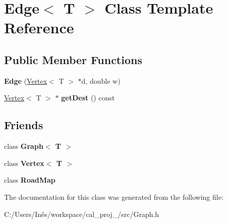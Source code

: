 \hypertarget{class_edge}{}\section{Edge$<$ T $>$ Class Template Reference}
\label{class_edge}
\subsection*{Public Member Functions}
\begin{DoxyCompactItemize}
\item 
\hypertarget{class_edge_a9da861a03f920c89984be33515a5d870}{}{\bfseries Edge} (\hyperlink{class_vertex}{Vertex}$<$ T $>$ $\ast$d, double w)\label{class_edge_a9da861a03f920c89984be33515a5d870}

\item 
\hypertarget{class_edge_aaf3e4cfb5351c3887c3f48b1c39e17f8}{}\hyperlink{class_vertex}{Vertex}$<$ T $>$ $\ast$ {\bfseries get\+Dest} () const \label{class_edge_aaf3e4cfb5351c3887c3f48b1c39e17f8}

\end{DoxyCompactItemize}
\subsection*{Friends}
\begin{DoxyCompactItemize}
\item 
\hypertarget{class_edge_aefa9b76cd57411c5354e5620dc2d84dd}{}class {\bfseries Graph$<$ T $>$}\label{class_edge_aefa9b76cd57411c5354e5620dc2d84dd}

\item 
\hypertarget{class_edge_a2e120a12dec663fa334633b4f26cbed8}{}class {\bfseries Vertex$<$ T $>$}\label{class_edge_a2e120a12dec663fa334633b4f26cbed8}

\item 
\hypertarget{class_edge_a4cadd08e990026c7a9877d35d45e719d}{}class {\bfseries Road\+Map}\label{class_edge_a4cadd08e990026c7a9877d35d45e719d}

\end{DoxyCompactItemize}


The documentation for this class was generated from the following file\+:\begin{DoxyCompactItemize}
\item 
C\+:/\+Users/\+Inês/workspace/cal\+\_\+proj\+\_/src/Graph.\+h\end{DoxyCompactItemize}
